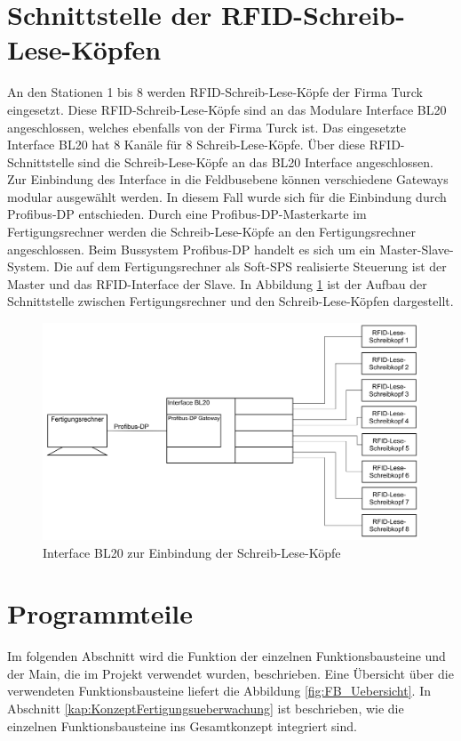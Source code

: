 \section{Schnittstelle der RFID-Schreib-Lese-Köpfen}
An den Stationen 1 bis 8 werden RFID-Schreib-Lese-Köpfe der Firma Turck eingesetzt. Diese RFID-Schreib-Lese-Köpfe sind an das Modulare Interface BL20 angeschlossen, welches ebenfalls von der Firma Turck ist. Das eingesetzte Interface BL20 hat 8 Kanäle für 8 Schreib-Lese-Köpfe. Über diese RFID-Schnittstelle sind die Schreib-Lese-Köpfe an das BL20 Interface angeschlossen. Zur Einbindung des Interface in die Feldbusebene können verschiedene Gateways modular ausgewählt werden. In diesem Fall wurde sich für die Einbindung durch Profibus-DP entschieden. Durch eine Profibus-DP-Masterkarte im Fertigungsrechner werden die Schreib-Lese-Köpfe an den Fertigungsrechner angeschlossen. Beim Bussystem Profibus-DP handelt es sich um ein Master-Slave-System. Die auf dem Fertigungsrechner als Soft-SPS realisierte Steuerung ist der Master und das RFID-Interface der Slave. In Abbildung \ref{fig:Interface_Leseköpfe} ist der Aufbau der Schnittstelle zwischen Fertigungsrechner und den Schreib-Lese-Köpfen dargestellt.\cite{BL_ident}
\begin{figure}[h]
	    \centering
	    \includegraphics[width=0.7\linewidth]{Bilder/Interface_RFID.png}
        \caption{Interface BL20 zur Einbindung der Schreib-Lese-Köpfe}
        \label{fig:Interface_Leseköpfe}
\end{figure}

\section{Programmteile}\label{kap:FBs}
Im folgenden Abschnitt wird die Funktion der einzelnen Funktionsbausteine und der Main, die im Projekt verwendet wurden, beschrieben. Eine Übersicht über die verwendeten Funktionsbausteine liefert die Abbildung \ref{fig:FB_Uebersicht}. In Abschnitt \ref{kap:KonzeptFertigungsueberwachung} ist beschrieben, wie die einzelnen Funktionsbausteine ins Gesamtkonzept integriert sind.  

